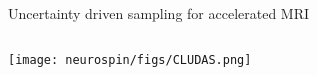 \begin{frame}{Uncertainty driven sampling for accelerated MRI \parencite{sanchez2020closed}}
\begin{columns}
\centering
\texttt{[image: neurospin/figs/CLUDAS.png]}

\centering

\end{columns}
\end{frame}
	
	



